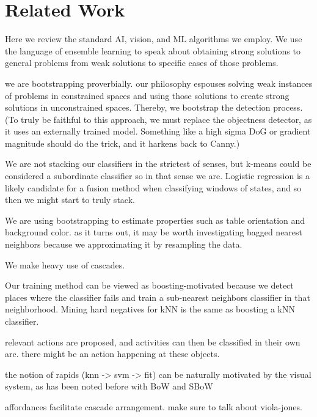 \documentclass[conference]{IEEEtran}
\begin{document}
\section{Related Work}
Here we review the standard AI, vision, and ML algorithms we employ.
We use the language of ensemble learning to speak about obtaining strong solutions to 
general problems from weak solutions to specific cases of those problems. 

we are bootstrapping proverbially. our philosophy espouses solving weak instances of 
problems in constrained spaces and using those solutions to create strong solutions 
in unconstrained spaces.  Thereby, we bootstrap the detection process. (To truly be 
faithful to this approach, we must replace the objectness detector, as it uses an 
externally trained model. Something like a high sigma DoG or gradient magnitude should 
do the trick, and it harkens back to Canny.)  

We are not stacking our classifiers in the strictest of senses, but k-means could be 
considered a subordinate classifier so in that sense we are.  Logistic regression is 
a likely candidate for a fusion method when classifying windows of states, and so then 
we might start to truly stack.

We are using bootstrapping to estimate properties such as table orientation and background 
color. as it turns out, it may be worth investigating bagged nearest neighbors because 
we approximating it by resampling the data.

We make heavy use of cascades.

Our training method can be viewed as boosting-motivated because we detect places where
the classifier fails and train a sub-nearest neighbors classifier in that neighborhood.
Mining hard negatives for kNN is the same as boosting a kNN classifier.

relevant actions are proposed, and activities can then be classified in their 
own arc. there might be an action happening at these objects.

the notion of rapids (knn -> svm -> fit) can be naturally motivated by the 
visual system, as has been noted before with BoW and SBoW 

affordances facilitate cascade arrangement. make sure to talk about viola-jones.

\end{document}
